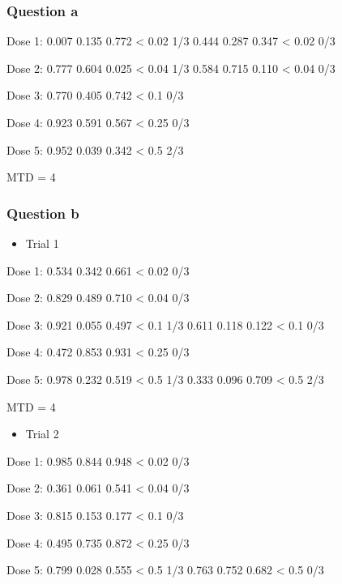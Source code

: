\documentclass[]{article}
\providecommand{\tightlist}{%
  \setlength{\itemsep}{0pt}\setlength{\parskip}{0pt}}
\begin{document}
\hypertarget{question-a-3}{%
\subsubsection{Question a}\label{question-a-3}}

Dose 1: 0.007 0.135 0.772 \textless{} 0.02 1/3 \textbar{} 0.444 0.287
0.347 \textless{} 0.02 0/3

Dose 2: 0.777 0.604 0.025 \textless{} 0.04 1/3 \textbar{} 0.584 0.715
0.110 \textless{} 0.04 0/3

Dose 3: 0.770 0.405 0.742 \textless{} 0.1 0/3

Dose 4: 0.923 0.591 0.567 \textless{} 0.25 0/3

Dose 5: 0.952 0.039 0.342 \textless{} 0.5 2/3

MTD = 4

\hypertarget{question-b-3}{%
\subsubsection{Question b}\label{question-b-3}}

\begin{itemize}
\tightlist
\item
  Trial 1
\end{itemize}

Dose 1: 0.534 0.342 0.661 \textless{} 0.02 0/3

Dose 2: 0.829 0.489 0.710 \textless{} 0.04 0/3

Dose 3: 0.921 0.055 0.497 \textless{} 0.1 1/3 \textbar{} 0.611 0.118
0.122 \textless{} 0.1 0/3

Dose 4: 0.472 0.853 0.931 \textless{} 0.25 0/3

Dose 5: 0.978 0.232 0.519 \textless{} 0.5 1/3 \textbar{} 0.333 0.096
0.709 \textless{} 0.5 2/3

MTD = 4

\begin{itemize}
\tightlist
\item
  Trial 2
\end{itemize}

Dose 1: 0.985 0.844 0.948 \textless{} 0.02 0/3

Dose 2: 0.361 0.061 0.541 \textless{} 0.04 0/3

Dose 3: 0.815 0.153 0.177 \textless{} 0.1 0/3

Dose 4: 0.495 0.735 0.872 \textless{} 0.25 0/3

Dose 5: 0.799 0.028 0.555 \textless{} 0.5 1/3 \textbar{} 0.763 0.752
0.682 \textless{} 0.5 0/3
\end{document}

